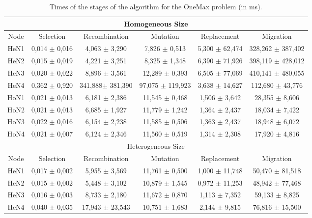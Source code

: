 \begin{table*}
\centering
\caption{Times of the stages of the algorithm for the OneMax problem (in ms).}
\begin{tabular}{|c|c|c|c|c|c|} \hline
\multicolumn{6}{|c|}{Homogeneous Size} \\ \hline
Node	& Selection		& Recombination		& Mutation		& Replacement		& Migration	        \\ \hline
HeN1	& 0,014	$\pm$ 0,016	& 4,063	$\pm$  3,290		& 7,826		$\pm$  	0,513	& 5,300 $\pm$ 62,474 &	328,262	$\pm$ 387,402 \\ \hline
HeN2	& 0,015	$\pm$ 0,019	& 4,221	$\pm$ 3,251			& 	8,325	$\pm$  	1,348	& 6,390	$\pm$ 71,926 &	398,119	$\pm$ 428,012 \\ \hline
HeN3	& 0,020	$\pm$ 0,022	& 8,896	$\pm$ 3,561			& 12,289	$\pm$  	0,393	& 6,505	$\pm$ 77,069 &	410,141	$\pm$ 480,055 \\ \hline
HeN4	& 0,362	$\pm$ 0,920	& 341,888$\pm$ 381,390		& 97,075	$\pm$  	119,923	& 3,638	$\pm$ 14,627 &	112,680	$\pm$ 43,776 \\ \hline \hline
HoN1	& 0,021	$\pm$ 0,013	& 6,181	$\pm$ 2,386			& 11,545	$\pm$  	0,468	& 1,506	$\pm$ 3,642	& 28,355	$\pm$ 8,606 \\ \hline
HoN2	& 0,021	$\pm$ 0,013	& 6,685	$\pm$ 1,927			& 11,779	$\pm$  	1,242	& 1,364	$\pm$ 2,437	& 18,034	$\pm$ 7,422 \\ \hline
HoN3	& 0,022	$\pm$ 0,016	& 6,154	$\pm$ 2,238			& 11,585	$\pm$  	0,506	& 1,363	$\pm$ 2,437	& 18,948	$\pm$ 6,072 \\ \hline
HoN4	& 0,021	$\pm$ 0,007	& 6,124	$\pm$ 2,346			& 11,560	$\pm$  	0,519	& 1,314	$\pm$ 2,308	& 17,920	$\pm$ 4,816 \\ \hline
\multicolumn{6}{|c|}{Heterogeneous Size} \\ \hline									
Node	& Selection		& Recombination		& Mutation		& Replacement		& Migration	\\ \hline
HeN1	& 0,017	$\pm$ 0,002	& 5,955	$\pm$ 3,569	    	& 11,761	$\pm$ 0,500		& 1,000	$\pm$ 11,748 & 50,470 $\pm$ 81,518 \\ \hline
HeN2	& 0,015	$\pm$ 0,002	& 5,448	$\pm$ 3,102			& 10,879	$\pm$ 1,545		& 0,972	$\pm$ 11,253 & 48,942 $\pm$ 77,468 \\ \hline
HeN3	& 0,016	$\pm$ 0,003	& 8,733	$\pm$ 2,180			& 11,672	$\pm$ 0,870		& 1,113	$\pm$ 7,352	& 59,133 $\pm$ 	8,825 \\ \hline
HeN4	& 0,040	$\pm$ 0,035	& 17,943 $\pm$ 23,543		& 10,751	$\pm$ 1,683		& 2,144	$\pm$ 9,815	& 76,816 $\pm$ 15,500 \\ \hline \hline

\end{tabular}
\end{table*}
